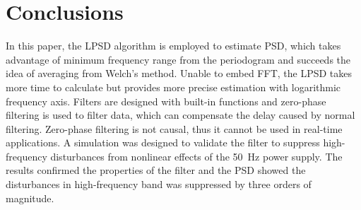 \section{Conclusions}


In this paper, the LPSD algorithm is employed to estimate PSD, which takes advantage of minimum frequency range from the periodogram and succeeds the idea of averaging from Welch's method. Unable to embed FFT, the LPSD takes more time to calculate but provides more precise estimation with logarithmic frequency axis. Filters are designed with built-in functions and zero-phase filtering is used to filter data, which can compensate the delay caused by normal filtering. Zero-phase filtering is not causal, thus it cannot be used in real-time applications. A simulation was designed to validate the filter to suppress high-frequency disturbances from nonlinear effects of the \SI{50}{Hz} power supply. The results confirmed the properties of the filter and the PSD showed the disturbances in high-frequency band was suppressed by three orders of magnitude.